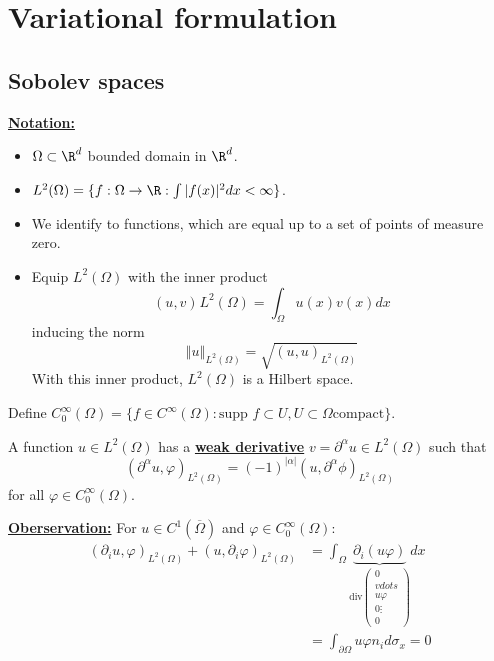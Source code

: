 \section{Variational formulation}

\subsection{Sobolev spaces}

\underline{\textbf{Notation:}} 
\begin{itemize}
    \item $\Omega\subset \R^d$ bounded domain in $\R^d$.
    \item $L^2(\Omega)=\{f:\Omega\to\R:\int |f(x)|^2 dx < \infty\}$.
    \item We identify to functions, which are equal up to a set of points of measure zero.
    \item Equip $L^2(\Omega)$ with the inner product \[(u,v)_{}L^2(\Omega)=\int_\Omega u(x)v(x)dx\] inducing the norm \[\left\Vert u \right\Vert_{L^2(\Omega)}=\sqrt{(u,u)_{L^2(\Omega)}}\] With this inner product, $L^2(\Omega)$ is a Hilbert space.
\end{itemize}

\begin{definition}
    Define $C_0^\infty(\Omega)=\{f\in C^\infty(\Omega):\text{supp } f\subset U, U \subset \Omega \text{compact}\}$.

    A function $u\in L^2(\Omega)$ has a \underline{\textbf{weak derivative}} $v=\partial^\alpha u\in L^2(\Omega)$ such that
    \[(\partial^\alpha u,\varphi)_{L^2(\Omega)}=(-1)^{|\alpha|}(u,\partial^\alpha \phi)_{L^2(\Omega)}\]
    for all $\varphi\in C_0^\infty(\Omega)$.
\end{definition}

\underline{\textbf{Oberservation:}} For $u\in C^1(\overline{\Omega})$ and $\varphi\in C_0^\infty(\Omega)$:
\begin{align*}
    (\partial_i u,\varphi)_{L^2(\Omega)}+(u,\partial_i \varphi)_{L^2(\Omega)}&=\int_{\Omega}\underbrace{\partial_i(u\varphi)}_{\text{div}\begin{pmatrix}0\\vdots\\u\varphi\\0\vdots \\0\end{pmatrix}}dx\\
    &= \int _{\partial \Omega} u\varphi n_i d\sigma_x=0
\end{align*}

